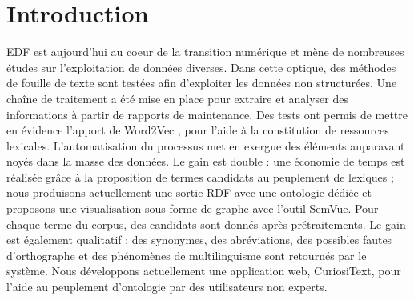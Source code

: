 \section{Introduction}

EDF est aujourd’hui au coeur de la transition numérique et mène de nombreuses études sur l’exploitation de données diverses. Dans cette optique, des méthodes de fouille de texte sont testées afin d’exploiter les données non structurées. Une chaîne de traitement a été mise en place pour extraire et analyser des informations à partir de rapports de maintenance. Des tests ont permis de mettre en évidence l’apport de Word2Vec \cite{DBLP:journals/corr/abs-1301-3781}, pour l’aide à la constitution de ressources lexicales. L’automatisation du processus met en exergue des éléments auparavant noyés dans la masse des données. Le gain est double : une économie de temps est réalisée grâce à la proposition de termes candidats au peuplement de lexiques ; nous produisons actuellement une sortie RDF avec une ontologie dédiée et proposons une visualisation sous forme de graphe avec l’outil SemVue. Pour chaque terme du corpus, des candidats sont donnés après prétraitements. Le gain est également qualitatif : des synonymes, des abréviations, des possibles fautes d’orthographe et des phénomènes de multilinguisme sont retournés par le système. Nous développons actuellement une application web, CuriosiText, pour l’aide au peuplement d’ontologie par des utilisateurs non experts.
